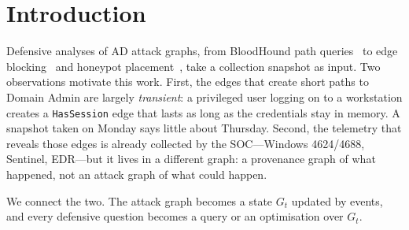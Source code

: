 \documentclass[10pt,twocolumn]{article}
\newcommand{\Gt}{G_t}
\begin{document}
\section{Introduction}

Defensive analyses of AD attack graphs, from BloodHound path queries~\cite{bloodhound}
to edge blocking~\cite{guo2022practical,guo2023scalable} and honeypot
placement~\cite{ngo2024catch}, take a collection snapshot as input. Two observations
motivate this work. First, the edges that create short paths to Domain Admin are
largely \emph{transient}: a privileged user logging on to a workstation creates a
\texttt{HasSession} edge that lasts as long as the credentials stay in memory. A
snapshot taken on Monday says little about Thursday. Second, the telemetry that
reveals those edges is already collected by the SOC---Windows 4624/4688, Sentinel,
EDR---but it lives in a different graph: a provenance graph of what happened, not an
attack graph of what could happen.

We connect the two. The attack graph becomes a state $\Gt$ updated by events, and
every defensive question becomes a query or an optimisation over $\Gt$.
\end{document}
